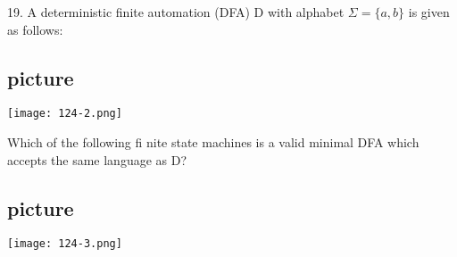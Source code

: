 \documentclass[9pt]{beamer}
\begin{document}
\begin{frame}
19. A deterministic finite automation (DFA) D with alphabet $\Sigma = \{a, b\}$ is given as follows:\\

\begin{center}
\section{picture}
\texttt{[image: 124-2.png]}
\end{center}

\vspace*{0.2cm}
\hspace*{0.5cm} Which of the following fi nite state machines is a valid minimal DFA which accepts the same
language as D?\\

\begin{center}
\section{picture}
\texttt{[image: 124-3.png]}
\end{center}
\end{frame}
\end{document}
